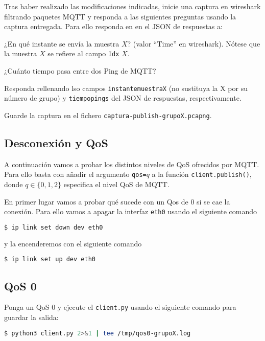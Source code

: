 \documentclass{upmassignment}
\begin{document}
Tras haber realizado las modificaciones
indicadas, inicie una captura en
wireshark filtrando paquetes MQTT y
responda a las siguientes
preguntas usando la captura entregada.
Para ello responda en
en el JSON de respuestas a:


\begin{problemlist}
    \pbitem ¿En qué instante
        se envía la muestra $X$?
        (valor ``Time'' en wireshark).
        Nótese que la muestra $X$
        se refiere al campo \texttt{Idx}
        $X$.

    \pbitem ¿Cuánto tiempo
        pasa entre dos 
        Ping de MQTT?
\end{problemlist}
Responda rellenando lso campos
\texttt{instantemuestraX} (no sustituya
la X por su número de grupo) y
\texttt{tiempopings} del JSON
de respuestas, respectivamente.

Guarde la captura en el fichero
\texttt{captura-publish-grupoX.pcapng}.


\subsection*{Desconexión y QoS}
\noindent A continuación vamos a probar
los distintos niveles de QoS ofrecidos
por MQTT. Para ello basta con
añadir el argumento
\texttt{qos=$q$} a la función
\texttt{client.publish()}, donde
$q\in\{0,1,2\}$ especifica el nivel
QoS de MQTT.

En primer lugar vamos a probar
qué sucede con un Qos de 0 si se
cae la conexión. Para ello vamos a
apagar la interfaz
\texttt{eth0} usando el
siguiente comando
\begin{lstlisting}[language=bash]
$ ip link set down dev eth0
\end{lstlisting}
y la encenderemos con el siguiente comando
\begin{lstlisting}[language=bash]
$ ip link set up dev eth0
\end{lstlisting}



\subsection*{QoS 0}
\noindent
Ponga un QoS 0 y ejecute el
\texttt{client.py} usando el
siguiente comando para guardar la salida:
\begin{lstlisting}[language=bash]
$ python3 client.py 2>&1 | tee /tmp/qos0-grupoX.log
\end{lstlisting}
\end{document}
